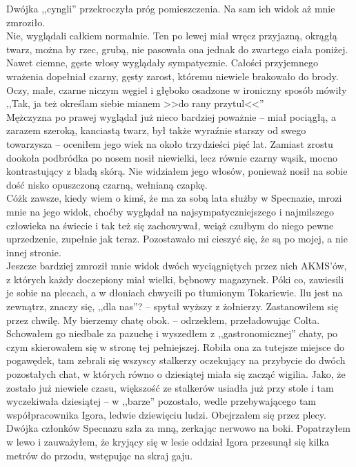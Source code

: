 \documentclass[../MAIN.tex]{subfiles}
\begin{document}
Dwójka ,,cyngli'' przekroczyła próg pomieszczenia. Na sam ich widok aż mnie zmroziło.\\
Nie, wyglądali całkiem normalnie. Ten po lewej miał wręcz przyjazną, okrągłą twarz, można by rzec, grubą, nie pasowała ona jednak do zwartego ciała poniżej. Nawet ciemne, gęste włosy wyglądały sympatycznie. Całości przyjemnego wrażenia dopełniał czarny, gęsty zarost, któremu niewiele brakowało do brody. Oczy, małe, czarne niczym węgiel i głęboko osadzone w ironiczny sposób mówiły ,,Tak, ja też określam siebie mianem >>do rany przytul<<''\\
Mężczyzna po prawej wyglądał już nieco bardziej poważnie -- miał pociągłą, a zarazem szeroką, kanciastą twarz, był także wyraźnie starszy od swego towarzysza -- oceniłem jego wiek na około trzydzieści pięć lat. Zamiast zrostu dookoła podbródka po nosem nosił niewielki, lecz równie czarny wąsik, mocno kontrastujący z bladą skórą. Nie widziałem jego włosów, ponieważ nosił na sobie dość nisko opuszczoną czarną, wełnianą czapkę.\\
Cóż\3k zawsze, kiedy wiem o kimś, że ma za sobą lata służby w Specnazie, mrozi mnie na jego widok, choćby wyglądał na najsympatyczniejszego i najmilszego człowieka na świecie i tak też się zachowywał, wciąż czułbym do niego pewne uprzedzenie, zupełnie jak teraz. Pozostawało mi cieszyć się, że są po mojej, a nie innej stronie.\\
Jeszcze bardziej zmroził mnie widok dwóch wyciągniętych przez nich AKMS’ów, z których każdy doczepiony miał wielki, bębnowy magazynek. Póki co, zawiesili je sobie na plecach, a w dłoniach chwycili po tłumionym Tokariewie.
\sx Ilu jest na zewnątrz, znaczy się, ,,dla nas''? -- spytał wyższy z żołnierzy.
\qd
Zastanowiłem się przez chwilę.
\sx My bierzemy chatę obok. -- odrzekłem, przeładowując Colta.
\qd
Schowałem go niedbale za pazuchę i wyszedłem z ,,gastronomicznej'' chaty, po czym skierowałem się w stronę tej pełniejszej. Robiła ona za tutejsze miejsce do pogawędek, tam zebrali się wszyscy stalkerzy oczekujący na przybycie do dwóch pozostałych chat, w których równo o dziesiątej miała się zacząć wigilia. Jako, że zostało już niewiele czasu, większość ze stalkerów usiadła już przy stole i tam wyczekiwała dziesiątej -- w ,,barze'' pozostało, wedle przebywającego tam współpracownika Igora, ledwie dziewięciu ludzi.
Obejrzałem się przez plecy. Dwójka członków Specnazu szła za mną, zerkając nerwowo na boki. Popatrzyłem w lewo i zauważyłem, że kryjący się w lesie oddział Igora przesunął się kilka metrów do przodu, wstępując na skraj gaju.\\
\end{document}
